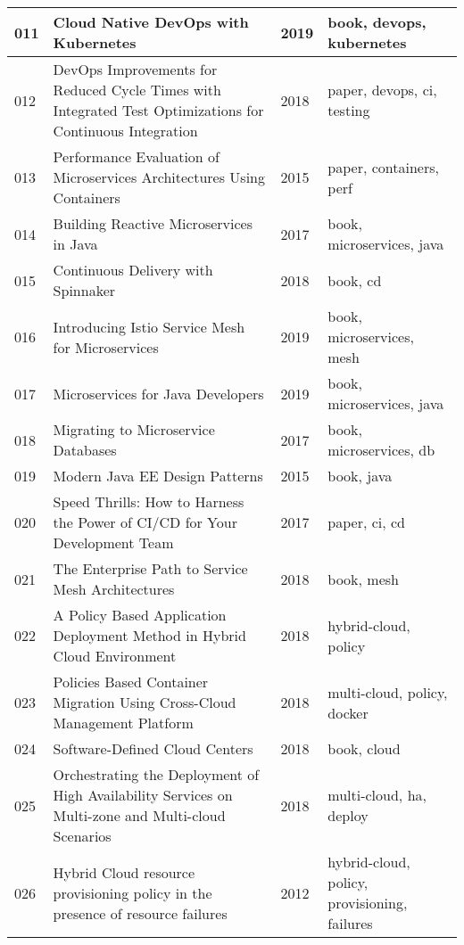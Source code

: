 \documentclass[11pt,a4paper]{article}
\begin{document}
\begin{longtable}{L{0.6cm}L{7.5cm}L{0.9cm}L{4cm}}
        011 & Cloud Native DevOps with Kubernetes\cite{coll:011} & 2019 & book, devops, kubernetes \\  & DevOps Improvements for Reduced Cycle Times with Integrated Test Optimizations for Continuous Integration\cite{coll:012} & 2018 & paper, devops, ci, testing \\  & Performance Evaluation of Microservices Architectures Using Containers\cite{coll:013} & 2015 & paper, containers, perf \\  & Building Reactive Microservices in Java\cite{coll:014} & 2017 & book, microservices, java \\  & Continuous Delivery with Spinnaker\cite{coll:015} & 2018 & book, cd \\  & Introducing Istio Service Mesh for Microservices\cite{coll:016} & 2019 & book, microservices, mesh \\  & Microservices for Java Developers\cite{coll:017} & 2019 & book, microservices, java \\  & Migrating to Microservice Databases\cite{coll:018} & 2017 & book, microservices, db \\  & Modern Java EE Design Patterns\cite{coll:019} & 2015 & book, java \\  & Speed Thrills: How to Harness the Power of CI/CD for Your Development Team\cite{coll:020} & 2017 & paper, ci, cd \\  & The Enterprise Path to Service Mesh Architectures\cite{coll:021} & 2018 & book, mesh \\  & A Policy Based Application Deployment Method in Hybrid Cloud Environment\cite{coll:022} & 2018 & hybrid-cloud, policy \\  & Policies Based Container Migration Using Cross-Cloud Management Platform\cite{coll:023} & 2018 & multi-cloud, policy, docker \\  & Software-Defined Cloud Centers\cite{coll:024} & 2018 & book, cloud \\  & Orchestrating the Deployment of High Availability Services on Multi-zone and Multi-cloud Scenarios\cite{coll:025} & 2018 & multi-cloud, ha, deploy \\  & Hybrid Cloud resource provisioning policy in the presence of resource failures\cite{coll:026} & 2012 & hybrid-cloud, policy, provisioning, failures \\ \midrule

\end{longtable}
\end{document}
